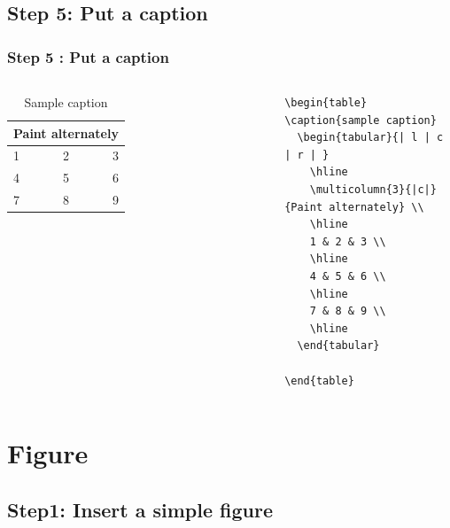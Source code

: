 \documentclass[article]{beamer}
\begin{document}
\subsection{Step 5: Put a caption}

\begin{frame}[fragile]
\frametitle{Step 5 : Put a caption }

\begin{columns}

\begin{table}
\caption{Sample caption}
  \begin{tabular}{| l | c | r | }  
    \hline
    \multicolumn{3}{|c|}{Paint alternately} \\
    \hline
    1 & 2 & 3 \\ 
    \hline
    4 & 5 & 6 \\
    \hline 
    7 & 8 & 9 \\
    \hline
  \end{tabular}

\end{table}

	
\tiny{
	\begin{verbatim}
\begin{table}
\caption{sample caption}
  \begin{tabular}{| l | c | r | }  
    \hline
    \multicolumn{3}{|c|}{Paint alternately} \\
    \hline
    1 & 2 & 3 \\ 
    \hline
    4 & 5 & 6 \\
    \hline 
    7 & 8 & 9 \\
    \hline
  \end{tabular}

\end{table}
	\end{verbatim}
}
\end{columns}
	
\end{frame}


\section{Figure}
\subsection{Step1: Insert a simple figure}
\end{document}
